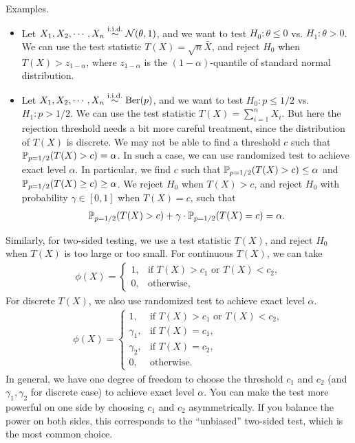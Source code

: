 \documentclass[11pt,letterpaper]{article}
\numberwithin{assumption}{lecture}
\numberwithin{theorem}{lecture}
\numberwithin{proposition}{lecture}
\numberwithin{lemma}{lecture}
\numberwithin{claim}{lecture}
\numberwithin{corollary}{lecture}
\numberwithin{definition}{lecture}
\numberwithin{conjecture}{lecture}
\numberwithin{remark}{lecture}
\numberwithin{example}{lecture}
\numberwithin{equation}{lecture}
\begin{document}
Examples.
\begin{itemize}
  \item Let $X_1, X_2, \cdots, X_n \overset{\mathrm{i.i.d.}}{\sim} \mathcal{N} (\theta, 1)$, and we want to test $H_0: \theta \leq 0$ vs. $H_1: \theta > 0$. We can use the test statistic $T(X) = \sqrt{n} \bar{X}$, and reject $H_0$ when $T(X) > z_{1 - \alpha}$, where $z_{1 - \alpha}$ is the $(1 - \alpha)$-quantile of standard normal distribution.
  \item Let $X_1, X_2, \cdots, X_n \overset{\mathrm{i.i.d.}}{\sim} \mathrm{Ber} (p)$, and we want to test $H_0: p \leq 1/2$ vs. $H_1: p > 1/2$. We can use the test statistic $T(X) = \sum_{i = 1}^n X_i$. But here the rejection threshold needs a bit more careful treatment, since the distribution of $T(X)$ is discrete. We may not be able to find a threshold $c$ such that ${\mathbb{P}}_{p = 1/2} (T(X) > c) = \alpha$. In such a case, we can use randomized test to achieve exact level $\alpha$. In particular, we find $c$ such that ${\mathbb{P}}_{p = 1/2} (T(X) > c) \leq \alpha$ and ${\mathbb{P}}_{p = 1/2} (T(X) \geq c) \geq \alpha$. We reject $H_0$ when $T(X) > c$, and reject $H_0$ with probability $\gamma \in [0,1]$ when $T(X) = c$, such that
  \begin{align*}
    {\mathbb{P}}_{p = 1/2} (T(X) > c) + \gamma \cdot {\mathbb{P}}_{p = 1/2} (T(X) = c) = \alpha.
  \end{align*}
\end{itemize}
Similarly, for two-sided testing, we use a test statistic $T(X)$, and reject $H_0$ when $T(X)$ is too large or too small. For continuous $T(X)$, we can take
\begin{align*}
  \phi (X) = \begin{cases}
    1, & \text{if } T(X) > c_1 \text{ or } T(X) < c_2,\\
    0, & \text{otherwise},
  \end{cases}
\end{align*}
For discrete $T(X)$, we also use randomized test to achieve exact level $\alpha$.
\begin{align*}
  \phi (X) = \begin{cases}
    1, & \text{if } T(X) > c_1 \text{ or } T(X) < c_2,\\
    \gamma_1, & \text{if } T(X) = c_1,\\
    \gamma_2, & \text{if } T(X) = c_2,\\
    0, & \text{otherwise}.
  \end{cases}
\end{align*}
In general, we have one degree of freedom to choose the threshold $c_1$ and $c_2$ (and $\gamma_1, \gamma_2$ for discrete case) to achieve exact level $\alpha$. You can make the test more powerful on one side by choosing $c_1$ and $c_2$ asymmetrically. If you balance the power on both sides, this corresponds to the ``unbiased'' two-sided test, which is the most common choice.
\end{document}
